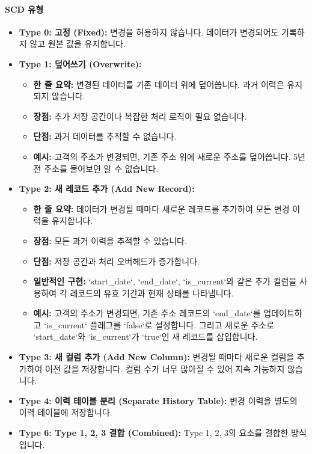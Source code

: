 \documentclass[11pt,a4paper]{article}
\begin{document}
\paragraph{SCD 유형}
\begin{itemize}
    \item \textbf{Type 0: 고정 (Fixed):} 변경을 허용하지 않습니다. 데이터가 변경되어도 기록하지 않고 원본 값을 유지합니다.
    \item \textbf{Type 1: 덮어쓰기 (Overwrite):}
    \begin{itemize}
        \item \textbf{한 줄 요약:} 변경된 데이터를 기존 데이터 위에 덮어씁니다. 과거 이력은 유지되지 않습니다.
        \item \textbf{장점:} 추가 저장 공간이나 복잡한 처리 로직이 필요 없습니다.
        \item \textbf{단점:} 과거 데이터를 추적할 수 없습니다.
        \item \textbf{예시:} 고객의 주소가 변경되면, 기존 주소 위에 새로운 주소를 덮어씁니다. 5년 전 주소를 물어보면 알 수 없습니다.
    \end{itemize}
    \item \textbf{Type 2: 새 레코드 추가 (Add New Record):}
    \begin{itemize}
        \item \textbf{한 줄 요약:} 데이터가 변경될 때마다 새로운 레코드를 추가하여 모든 변경 이력을 유지합니다.
        \item \textbf{장점:} 모든 과거 이력을 추적할 수 있습니다.
        \item \textbf{단점:} 저장 공간과 처리 오버헤드가 증가합니다.
        \item \textbf{일반적인 구현:} `start_date`, `end_date`, `is_current`와 같은 추가 컬럼을 사용하여 각 레코드의 유효 기간과 현재 상태를 나타냅니다.
        \item \textbf{예시:} 고객의 주소가 변경되면, 기존 주소 레코드의 `end_date`를 업데이트하고 `is_current` 플래그를 `false`로 설정합니다. 그리고 새로운 주소로 `start_date`와 `is_current`가 `true`인 새 레코드를 삽입합니다.
    \end{itemize}
    \item \textbf{Type 3: 새 컬럼 추가 (Add New Column):} 변경될 때마다 새로운 컬럼을 추가하여 이전 값을 저장합니다. 컬럼 수가 너무 많아질 수 있어 지속 가능하지 않습니다.
    \item \textbf{Type 4: 이력 테이블 분리 (Separate History Table):} 변경 이력을 별도의 이력 테이블에 저장합니다.
    \item \textbf{Type 6: Type 1, 2, 3 결합 (Combined):} Type 1, 2, 3의 요소를 결합한 방식입니다.
\end{itemize}
\end{document}
